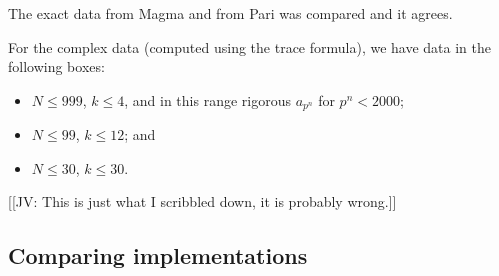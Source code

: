 \documentclass[11pt]{amsart}
\numberwithin{equation}{subsection}
\theoremstyle{plain}
\theoremstyle{definition}
\newcommand{\jv}[1]{{\color{red} \textsf{[[JV: #1]]}}}
\begin{document}
\begin{comment}
I finished weight 1 to level 2000, data uploaded.  Approximately twice as much stuff as for 1-1000.  Here are the stats (for level ranges 1-1000 and 1001-2000 separately; the files are about 24 and 56 mb):

sage: gdata1 = read_dtp("mfdata_wt1_1000.gp.txt")
Read 26852 spaces of which 1368 are nontrivial; 2130 Galois orbits.
2088 orbits have dimension <=20
largest three dimsensions: [42, 46, 52]
Total time = 155525.304
Max time = 1869.929 for space (975, 1, 62)
Average time (all spaces)      = 5.792
Average time (nonzero spaces)  = 47.931

sage: gdata2 = read_dtp("mfdata_wt1_1001-2000.gp.txt")
Read 47348 spaces of which 2287 are nontrivial; 4309 Galois orbits.
4050 orbits have dimension <=20
largest three dimsensions: [106, 112, 130]
Total time = 1592922.855
Max time = 29630.354 for space (1950, 1, 63)
Average time (all spaces)      = 33.643
Average time (nonzero spaces)  = 210.930

The bulk of the weight>1 for Nk^2 up to 2000 are done, but as usual a few hard cases are holding things up (some have been running 70h).  I did write to Karim but have had no reply yet.

John
\end{comment}

The exact data from Magma and from Pari was compared and it agrees.

For the complex data (computed using the trace formula), we have data in the following boxes:
\begin{itemize}
\item $N \leq 999$, $k \leq 4$, and in this range rigorous $a_{p^n}$ for $p^n < 2000$;
\item $N \leq 99$, $k \leq 12$; and
\item $N \leq 30$, $k \leq 30$.
\end{itemize}
\jv{This is just what I scribbled down, it is probably wrong.}

\subsection{Comparing implementations}
\end{document}
